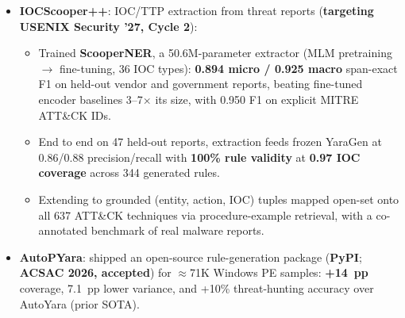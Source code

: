 \documentclass[letterpaper,11pt]{article}
\begin{document}
\begin{itemize}
\begin{itemize}
    \item Assembled three corpora (\textbf{305K crawled} in-the-wild rules from 59 repos; \textbf{15M synthetic} from 459 curated templates; \textbf{15M grammar-fuzzed}) and built the \textit{Brownie \& Puff} composite evaluators (BLEU + parse/compile + \textbf{Z3 SMT semantic comparison}) as training-time signals; only the composite correlated positively with test accuracy (BLEU Spearman down to $-$0.70).
    \item Downstream on EMBER malware clusters, generated rules reach \textbf{96$\pm$4\% TP at 0.8\% FP} (99.7\% generation success) vs.\ AutoYara's 93$\pm$6\% at 0.5\% FP; open-sourced the framework, models, and an agentic web chatbot.
    \item \textit{In progress:} extending YaraGen with tool use and verify-and-repair; designing verified multi-task SFT and an RLVR pilot with executable, formally checked rewards.
  \end{itemize}
  \item \textbf{IOCScooper++}: IOC/TTP extraction from threat reports (\textbf{targeting USENIX Security '27, Cycle 2}):
  \begin{itemize}\small
    \item Trained \textbf{ScooperNER}, a 50.6M-parameter extractor (MLM pretraining $\rightarrow$ fine-tuning, 36 IOC types): \textbf{0.894 micro / 0.925 macro} span-exact F1 on held-out vendor and government reports, beating fine-tuned encoder baselines 3--7$\times$ its size, with 0.950 F1 on explicit MITRE ATT\&CK IDs.
    \item End to end on 47 held-out reports, extraction feeds frozen YaraGen at 0.86/0.88 precision/recall with \textbf{100\% rule validity} at \textbf{0.97 IOC coverage} across 344 generated rules.
    \item Extending to grounded (entity, action, IOC) tuples mapped open-set onto all 637 ATT\&CK techniques via procedure-example retrieval, with a co-annotated benchmark of real malware reports.
  \end{itemize}
  \item \textbf{AutoPYara}: shipped an open-source rule-generation package (\textbf{PyPI}; \textbf{ACSAC 2026, accepted}) for $\approx$71K Windows PE samples: \textbf{+14~pp} coverage, 7.1~pp lower variance, and +10\% threat-hunting accuracy over AutoYara (prior SOTA).
\end{itemize}
\end{document}
